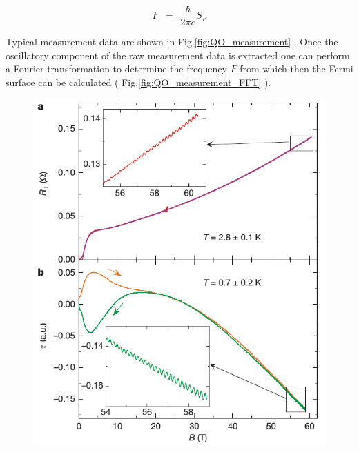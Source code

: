 \documentclass[10pt]{report}
\numberwithin{equation}{chapter}
\newcommand{\myRef}[1]{
  Fig.\ref{#1}
}
\begin{document}
\begin{equation} \label{eq:onsager_relation}
  F ~~=~~ \frac{\hbar}{2\pi e} S_F
\end{equation} 


Typical measurement data are shown in \myRef{fig:QO_measurement}. Once the oscillatory component of the raw measurement data is extracted one can perform a Fourier transformation to determine the frequency $F$ from which then the Fermi surface can be calculated (\myRef{fig:QO_measurement_FFT}).




\begin{figure}[t]
  \begin{minipage}[c][6.00cm]{.40\textwidth}
    \vspace*{\fill}
    \centering
    \includegraphics[width=1.0\linewidth]{../img/QO_measurement_ab.png}
    \captionsetup{width=.95\linewidth}
  \end{minipage}%
  \begin{minipage}[c][6.00cm]{.60\textwidth}
    \centering

\end{minipage}
\end{figure}
\end{document}
